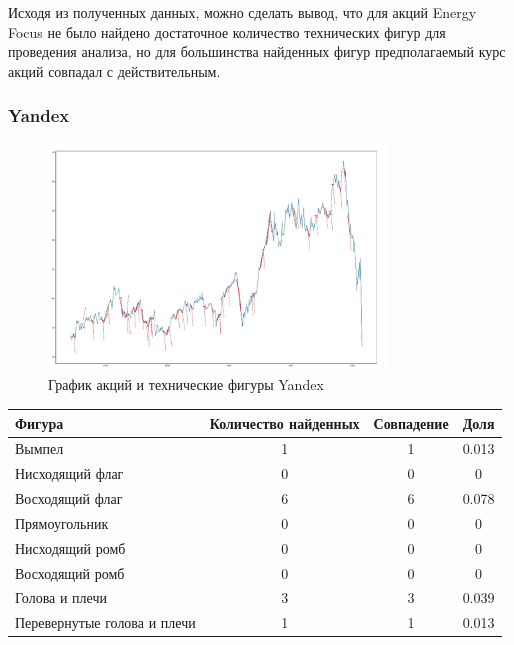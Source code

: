 \documentclass[bachelor, och, coursework]{SCWorks}
\begin{document}
    Исходя из полученных данных, можно сделать вывод, что для акций Energy Focus
    не было найдено достаточное количество технических фигур для проведения 
    анализа, но для большинства найденных фигур предполагаемый курс акций 
    совпадал с действительным.


    \subsubsection{Yandex}
    
    \begin{figure}[H]
        \centering
        \includegraphics[width=0.8\textwidth]{pic/Yandex.jpg}
        \caption{График акций и технические фигуры Yandex}
    \end{figure}
   
    \begin{table}[!hbt]
        \centering
        \begin{tabular}{|l|c|c|c|}
        \hline
        Фигура                      & \multicolumn{1}{l|}{Количество найденных} & Совпадение & Доля  \\ \hline
        Вымпел                      & 1                                         & 1          & 0.013 \\ \hline
        Нисходящий флаг             & 0                                         & 0          & 0     \\ \hline
        Восходящий флаг             & 6                                         & 6          & 0.078 \\ \hline
        Прямоугольник               & 0                                         & 0          & 0     \\ \hline
        Нисходящий ромб             & 0                                         & 0          & 0     \\ \hline
        Восходящий ромб             & 0                                         & 0          & 0     \\ \hline
        Голова и плечи              & 3                                         & 3          & 0.039 \\ \hline
        Перевернутые голова и плечи & 1                                         & 1          & 0.013 \\ \hline
        \end{tabular}
        \end{table}
\end{document}

